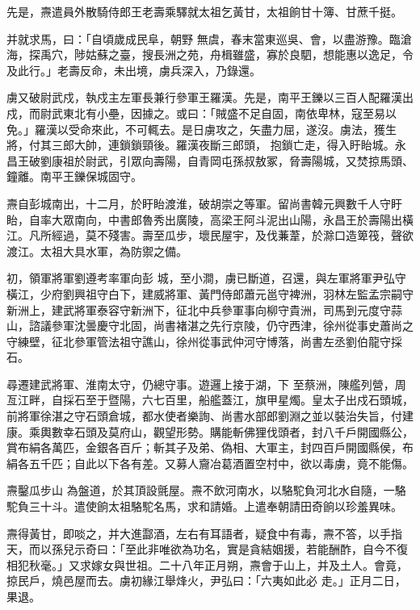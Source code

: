 \begin{pinyinscope}
 先是，燾遣員外散騎侍郎王老壽乘驛就太祖乞黃甘，太祖餉甘十簿、甘蔗千挺。



 并就求馬，曰：「自頃歲成民阜，朝野
 無虞，春末當東巡吳、會，以盡游豫。臨滄海，探禹穴，陟姑蘇之臺，搜長洲之苑，舟楫雖盛，寡於良駟，想能惠以逸足，令及此行。」老壽反命，未出境，虜兵深入，乃錄還。



 虜又破尉武戍，執戍主左軍長兼行參軍王羅漢。先是，南平王鑠以三百人配羅漢出戍，而尉武東北有小壘，因據之。或曰：「賊盛不足自固，南依卑林，寇至易以免。」羅漢以受命來此，不可輒去。是日虜攻之，矢盡力屈，遂沒。虜法，獲生將，付其三郎大帥，連鎖鎖頸後。羅漢夜斷三郎頭，
 抱鎖亡走，得入盱眙城。永昌王破劉康祖於尉武，引眾向壽陽，自青岡屯孫叔敖冢，脅壽陽城，又焚掠馬頭、鐘離。南平王鑠保城固守。



 燾自彭城南出，十二月，於盱眙渡淮，破胡崇之等軍。留尚書韓元興數千人守盱眙，自率大眾南向，中書郎魯秀出廣陵，高梁王阿斗泥出山陽，永昌王於壽陽出橫江。凡所經過，莫不殘害。壽至瓜步，壞民屋宇，及伐蒹葦，於滁口造箄筏，聲欲渡江。太祖大具水軍，為防禦之備。



 初，領軍將軍劉遵考率軍向彭
 城，至小澗，虜已斷道，召還，與左軍將軍尹弘守橫江，少府劉興祖守白下，建威將軍、黃門侍郎蕭元邕守裨洲，羽林左監孟宗嗣守新洲上，建武將軍泰容守新洲下，征北中兵參軍事向柳守貴洲，司馬到元度守蒜山，諮議參軍沈曇慶守北固，尚書褚湛之先行京陵，仍守西津，徐州從事史蕭尚之守練壁，征北參軍管法祖守譙山，徐州從事武仲河守博落，尚書左丞劉伯龍守採石。



 尋遷建武將軍、淮南太守，仍總守事。遊邏上接于湖，下
 至蔡洲，陳艦列營，周亙江畔，自採石至于暨陽，六七百里，船艦蓋江，旗甲星燭。皇太子出戍石頭城，前將軍徐湛之守石頭倉城，都水使者樂詢、尚書水部郎劉淵之並以裝治失旨，付建康。乘輿數幸石頭及莫府山，觀望形勢。購能斬佛狸伐頭者，封八千戶開國縣公，賞布絹各萬匹，金銀各百斤；斬其子及弟、偽相、大軍主，封四百戶開國縣侯，布絹各五千匹；自此以下各有差。又募人齎冶葛酒置空村中，欲以毒虜，竟不能傷。



 燾鑿瓜步山
 為盤道，於其頂設氈屋。燾不飲河南水，以駱駝負河北水自隨，一駱駝負三十斗。遣使餉太祖駱駝名馬，求和請婚。上遣奉朝請田奇餉以珍羞異味。



 燾得黃甘，即啖之，并大進酃酒，左右有耳語者，疑食中有毒，燾不答，以手指天，而以孫兒示奇曰：「至此非唯欲為功名，實是貪結姻援，若能酬酢，自今不復相犯秋毫。」又求嫁女與世祖。二十八年正月朔，燾會于山上，并及土人。會竟，掠民戶，燒邑屋而去。虜初緣江舉烽火，尹弘曰：「六夷如此必
 走。」正月二日，果退。




\end{pinyinscope}
